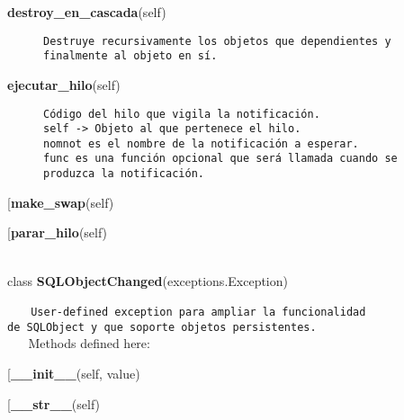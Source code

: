 \begin{description}\item[{\bf destroy\_en\_cascada}(self)]{\tt Destruye~recursivamente~los~objetos~que~dependientes~y~\\
finalmente~al~objeto~en~sí.}\end{description}

\begin{description}\item[{\bf ejecutar\_hilo}(self)\end{description}

\begin{description}\item[{\bf esperarNotificacion}(self, nomnot, func=<function <lambda>>)]{\tt Código~del~hilo~que~vigila~la~notificación.\\
self~->~Objeto~al~que~pertenece~el~hilo.\\
nomnot~es~el~nombre~de~la~notificación~a~esperar.\\
func~es~una~función~opcional~que~será~llamada~cuando~se\\
produzca~la~notificación.}\end{description}

\begin{description}\item[{\bf make\_swap}(self)\end{description}

\begin{description}\item[{\bf parar\_hilo}(self)\end{description}

 \par 


~\\
class {\bf SQLObjectChanged}(exceptions.Exception)
    
{\tt ~~~}
{\tt User-defined~exception~para~ampliar~la~funcionalidad\\
de~SQLObject~y~que~soporte~objetos~persistentes.\\~}
~
Methods defined here:\\
\begin{description}\item[{\bf \_\_init\_\_}(self, value)\end{description}

\begin{description}\item[{\bf \_\_str\_\_}(self)\end{description}


